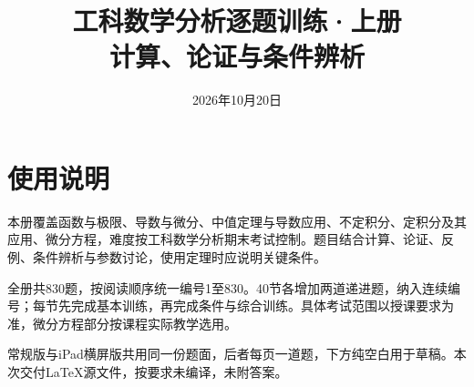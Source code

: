 \documentclass[11pt,a4paper,fontset=fandol]{ctexart}
\title{工科数学分析逐题训练·上册\\[0.4em]\large 计算、论证与条件辨析}
\author{}
\date{2026年10月20日}
\begin{document}
\maketitle
\section*{使用说明}
本册覆盖函数与极限、导数与微分、中值定理与导数应用、不定积分、定积分及其应用、微分方程，难度按工科数学分析期末考试控制。题目结合计算、论证、反例、条件辨析与参数讨论，使用定理时应说明关键条件。

全册共830题，按阅读顺序统一编号1至830。40节各增加两道递进题，纳入连续编号；每节先完成基本训练，再完成条件与综合训练。具体考试范围以授课要求为准，微分方程部分按课程实际教学选用。

常规版与iPad横屏版共用同一份题面，后者每页一道题，下方纯空白用于草稿。本次交付LaTeX源文件，按要求未编译，未附答案。
\tableofcontents
\clearpage

\clearpage

\clearpage

\clearpage

\clearpage

\clearpage

\clearpage

\end{document}
